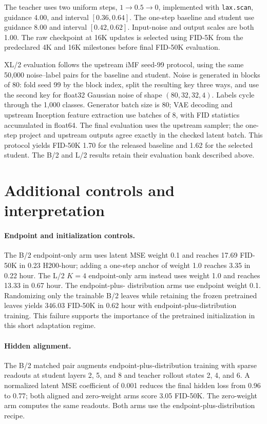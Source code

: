 The teacher uses two uniform steps, $1\!\to\!0.5\!\to\!0$, implemented with
\texttt{lax.scan}, guidance 4.00, and interval $[0.36,0.64]$.
The one-step baseline and student use guidance 8.00 and interval
$[0.42,0.62]$. Input-noise and output scales are both 1.00.
The raw checkpoint at 16K updates is selected using FID-5K from the
predeclared 4K and 16K milestones before final FID-50K evaluation.

XL/2 evaluation follows the upstream iMF seed-99 protocol, using the same
50,000 noise--label pairs for the baseline and student. Noise is generated
in blocks of 80: fold seed 99 by the block index, split the resulting key
three ways, and use the second key for float32 Gaussian noise of shape
$(80,32,32,4)$. Labels cycle through the 1,000 classes. Generator batch size
is 80; VAE decoding and upstream Inception feature extraction use batches
of 8, with FID statistics accumulated in float64. The final evaluation
uses the upstream sampler; the one-step project and upstream outputs agree
exactly in the checked latent batch. This protocol yields FID-50K 1.70 for
the released baseline and 1.62 for the selected student. The B/2 and L/2
results retain their evaluation bank described above.

\section{Additional controls and interpretation}
\label{app:controls}

\paragraph{Endpoint and initialization controls.}
The B/2 endpoint-only arm uses latent MSE weight 0.1 and reaches 17.69
FID-50K in 0.23 H200-hour; adding a one-step anchor of weight 1.0 reaches
3.35 in 0.22 hour. The L/2 $K=4$ endpoint-only arm instead uses weight 1.0
and reaches 13.33 in 0.67 hour. The endpoint-plus-
distribution arms use endpoint weight 0.1. Randomizing only the trainable
B/2 leaves while retaining the frozen pretrained leaves yields 346.03
FID-50K in 0.62 hour with endpoint-plus-distribution training. This failure
supports the importance of the pretrained initialization in this short
adaptation regime.

\paragraph{Hidden alignment.}
The B/2 matched pair augments endpoint-plus-distribution training with sparse
readouts at student layers 2, 5, and 8 and teacher rollout states 2, 4, and 6.
A normalized latent MSE coefficient of 0.001 reduces the final hidden loss
from 0.96 to 0.77; both aligned and zero-weight arms score 3.05 FID-50K.
The zero-weight arm computes the same readouts. Both arms use the
endpoint-plus-distribution recipe.

